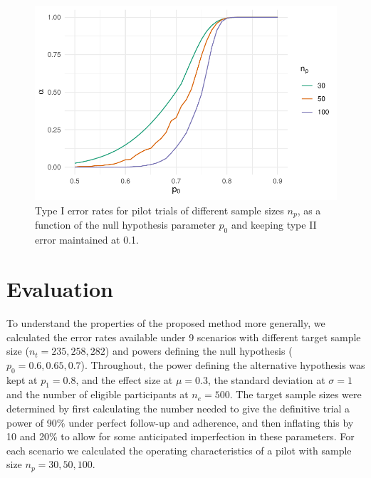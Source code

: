 \documentclass[AMA,STIX1COL]{WileyNJD-v2}
\begin{document}
\begin{figure}
\centering
\includegraphics[scale=0.8]{./Figures/eval2.pdf}
\caption{Type I error rates for pilot trials of different sample sizes $n_p$, as a function of the null hypothesis parameter $p_0$ and keeping type II error maintained at 0.1.}
\label{fig:eval2}
\end{figure}

\section{Evaluation}\label{sec:eval}


To understand the properties of the proposed method more generally, we calculated the error rates available under 9 scenarios with different target sample size ($n_t = 235, 258, 282$) and powers defining the null hypothesis ($p_0 = 0.6, 0.65, 0.7$). Throughout, the power defining the alternative hypothesis was kept at $p_1 = 0.8$, and the effect size at $\mu = 0.3$, the standard deviation at $\sigma = 1$ and the number of eligible participants at $n_e = 500$. The target sample sizes were determined by first calculating the number needed to give the definitive trial a power of 90\% under perfect follow-up and adherence, and then inflating this by 10 and 20\% to allow for some anticipated imperfection in these parameters. For each scenario we calculated the operating characteristics of a pilot with sample size $n_p = 30, 50, 100$.
\end{document}
